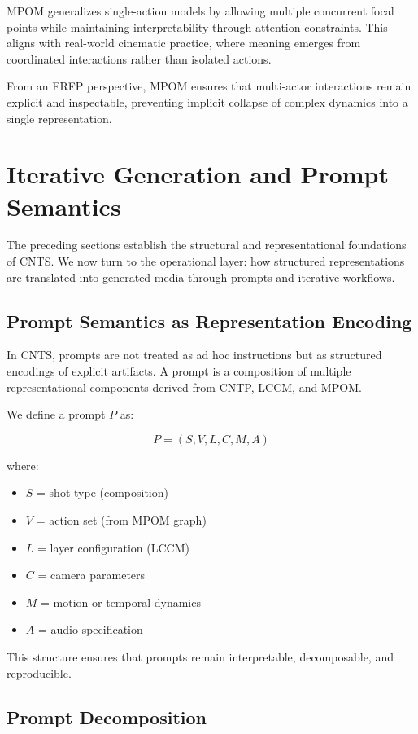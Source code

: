 \documentclass[preprints,article,submit,pdftex,moreauthors,accept]{Definitions/mdpi}
\begin{document}
MPOM generalizes single-action models by allowing multiple concurrent focal points while maintaining interpretability through attention constraints. This aligns with real-world cinematic practice, where meaning emerges from coordinated interactions rather than isolated actions.

From an FRFP perspective, MPOM ensures that multi-actor interactions remain explicit and inspectable, preventing implicit collapse of complex dynamics into a single representation.

\section{Iterative Generation and Prompt Semantics}

The preceding sections establish the structural and representational foundations of CNTS. We now turn to the operational layer: how structured representations are translated into generated media through prompts and iterative workflows.

\subsection{Prompt Semantics as Representation Encoding}

In CNTS, prompts are not treated as ad hoc instructions but as structured encodings of explicit artifacts. A prompt is a composition of multiple representational components derived from CNTP, LCCM, and MPOM.

We define a prompt $P$ as:

\[
P = (S, V, L, C, M, A)
\]

where:
\begin{itemize}
    \item $S$ = shot type (composition)
    \item $V$ = action set (from MPOM graph)
    \item $L$ = layer configuration (LCCM)
    \item $C$ = camera parameters
    \item $M$ = motion or temporal dynamics
    \item $A$ = audio specification
\end{itemize}

This structure ensures that prompts remain interpretable, decomposable, and reproducible.

\subsection{Prompt Decomposition}
\end{document}

